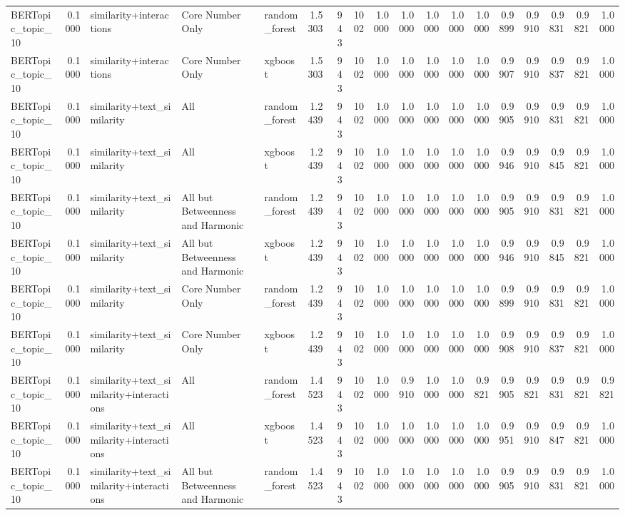 \begin{tabular}{lrlllrrrrrrrrrrrrr}
BERTopic_topic_10 & 0.1000 & similarity+interactions & Core Number Only & random_forest & 1.5303 & 943 & 1002 & 1.0000 & 1.0000 & 1.0000 & 1.0000 & 1.0000 & 0.9899 & 0.9910 & 0.9831 & 0.9821 & 1.0000 \\
BERTopic_topic_10 & 0.1000 & similarity+interactions & Core Number Only & xgboost & 1.5303 & 943 & 1002 & 1.0000 & 1.0000 & 1.0000 & 1.0000 & 1.0000 & 0.9907 & 0.9910 & 0.9837 & 0.9821 & 1.0000 \\
BERTopic_topic_10 & 0.1000 & similarity+text_similarity & All & random_forest & 1.2439 & 943 & 1002 & 1.0000 & 1.0000 & 1.0000 & 1.0000 & 1.0000 & 0.9905 & 0.9910 & 0.9831 & 0.9821 & 1.0000 \\
BERTopic_topic_10 & 0.1000 & similarity+text_similarity & All & xgboost & 1.2439 & 943 & 1002 & 1.0000 & 1.0000 & 1.0000 & 1.0000 & 1.0000 & 0.9946 & 0.9910 & 0.9845 & 0.9821 & 1.0000 \\
BERTopic_topic_10 & 0.1000 & similarity+text_similarity & All but Betweenness and Harmonic & random_forest & 1.2439 & 943 & 1002 & 1.0000 & 1.0000 & 1.0000 & 1.0000 & 1.0000 & 0.9905 & 0.9910 & 0.9831 & 0.9821 & 1.0000 \\
BERTopic_topic_10 & 0.1000 & similarity+text_similarity & All but Betweenness and Harmonic & xgboost & 1.2439 & 943 & 1002 & 1.0000 & 1.0000 & 1.0000 & 1.0000 & 1.0000 & 0.9946 & 0.9910 & 0.9845 & 0.9821 & 1.0000 \\
BERTopic_topic_10 & 0.1000 & similarity+text_similarity & Core Number Only & random_forest & 1.2439 & 943 & 1002 & 1.0000 & 1.0000 & 1.0000 & 1.0000 & 1.0000 & 0.9899 & 0.9910 & 0.9831 & 0.9821 & 1.0000 \\
BERTopic_topic_10 & 0.1000 & similarity+text_similarity & Core Number Only & xgboost & 1.2439 & 943 & 1002 & 1.0000 & 1.0000 & 1.0000 & 1.0000 & 1.0000 & 0.9908 & 0.9910 & 0.9837 & 0.9821 & 1.0000 \\
BERTopic_topic_10 & 0.1000 & similarity+text_similarity+interactions & All & random_forest & 1.4523 & 943 & 1002 & 1.0000 & 0.9910 & 1.0000 & 1.0000 & 0.9821 & 0.9905 & 0.9821 & 0.9831 & 0.9821 & 0.9821 \\
BERTopic_topic_10 & 0.1000 & similarity+text_similarity+interactions & All & xgboost & 1.4523 & 943 & 1002 & 1.0000 & 1.0000 & 1.0000 & 1.0000 & 1.0000 & 0.9951 & 0.9910 & 0.9847 & 0.9821 & 1.0000 \\
BERTopic_topic_10 & 0.1000 & similarity+text_similarity+interactions & All but Betweenness and Harmonic & random_forest & 1.4523 & 943 & 1002 & 1.0000 & 1.0000 & 1.0000 & 1.0000 & 1.0000 & 0.9905 & 0.9910 & 0.9831 & 0.9821 & 1.0000 \\

\end{tabular}
